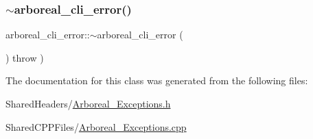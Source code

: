 \subsubsection{\texorpdfstring{$\sim$arboreal\+\_\+cli\+\_\+error()}{~arboreal\_cli\_error()}}
{\footnotesize\ttfamily arboreal\+\_\+cli\+\_\+error\+::$\sim$arboreal\+\_\+cli\+\_\+error (\begin{DoxyParamCaption}{ }\end{DoxyParamCaption}) throw  ) }



The documentation for this class was generated from the following files\+:\begin{DoxyCompactItemize}
\item 
Shared\+Headers/\mbox{\hyperlink{_arboreal___exceptions_8h}{Arboreal\+\_\+\+Exceptions.\+h}}\item 
Shared\+C\+P\+P\+Files/\mbox{\hyperlink{_arboreal___exceptions_8cpp}{Arboreal\+\_\+\+Exceptions.\+cpp}}\end{DoxyCompactItemize}
